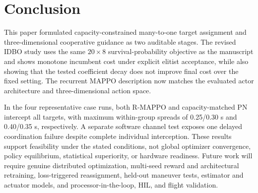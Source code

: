 \documentclass[lettersize,journal]{IEEEtran}
\begin{document}
{\section{Conclusion}
\label{sec:conclusion}

This paper formulated capacity-constrained many-to-one target assignment and
three-dimensional cooperative guidance as two auditable stages. The revised IDBO
study uses the same \(20\times8\) survival-probability objective as the manuscript
and shows monotone incumbent cost under explicit elitist acceptance, while also
showing that the tested coefficient decay does not improve final cost over the
fixed setting. The recurrent MAPPO description now matches the evaluated actor
architecture and three-dimensional action space.

In the four representative case runs, both R-MAPPO and capacity-matched PN
intercept all targets, with maximum within-group spreads of 0.25/0.30 s and
0.40/0.35 s, respectively. A separate software channel test exposes one delayed
coordination failure despite complete individual interception. These results
support feasibility under the stated conditions, not global optimizer
convergence, policy equilibrium, statistical superiority, or hardware readiness.
Future work will require genuine distributed optimization, multi-seed reward and
architectural retraining, loss-triggered reassignment, held-out maneuver tests, estimator and
actuator models, and processor-in-the-loop, HIL, and flight validation.
}



\end{document}
